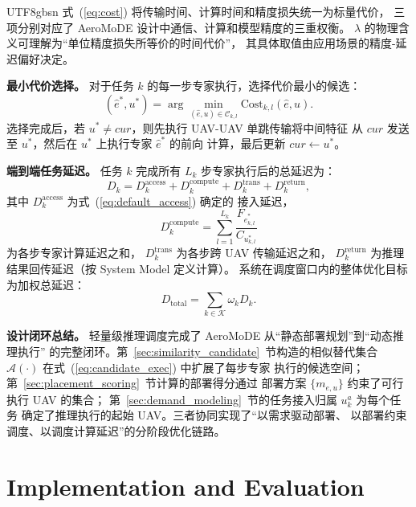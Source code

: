 \documentclass[conference]{IEEEtran}
\begin{document}
\begin{CJK*}{UTF8}{gbsn}
式~(\ref{eq:cost}) 将传输时间、计算时间和精度损失统一为标量代价，
三项分别对应了 AeroMoDE 设计中通信、计算和模型精度的三重权衡。
$\lambda$ 的物理含义可理解为``单位精度损失所等价的时间代价''，
其具体取值由应用场景的精度-延迟偏好决定。

\textbf{最小代价选择。}
对于任务 $k$ 的每一步专家执行，选择代价最小的候选：
\begin{equation}
(\hat{e}^*, u^*) = \arg\min_{(\hat{e},u)\in\mathcal{C}_{k,l}}
\mathrm{Cost}_{k,l}(\hat{e},u).
\label{eq:min_cost}
\end{equation}
选择完成后，若 $u^* \neq cur$，则先执行 UAV-UAV 单跳传输将中间特征
从 $cur$ 发送至 $u^*$，然后在 $u^*$ 上执行专家 $\hat{e}^*$ 的前向
计算，最后更新 $cur \leftarrow u^*$。

\textbf{端到端任务延迟。}
任务 $k$ 完成所有 $L_k$ 步专家执行后的总延迟为：
\begin{equation}
D_k = D_k^{\mathrm{access}} + D_k^{\mathrm{compute}}
    + D_k^{\mathrm{trans}} + D_k^{\mathrm{return}},
\label{eq:Dk}
\end{equation}
其中 $D_k^{\mathrm{access}}$ 为式~(\ref{eq:default_access}) 确定的
接入延迟，
\begin{equation}
D_k^{\mathrm{compute}} = \sum_{l=1}^{L_k} \frac{F_{\hat{e}^*_{k,l}}}{C_{u^*_{k,l}}}
\end{equation}
为各步专家计算延迟之和，
$D_k^{\mathrm{trans}}$ 为各步跨 UAV 传输延迟之和，
$D_k^{\mathrm{return}}$ 为推理结果回传延迟（按 System Model 定义计算）。
系统在调度窗口内的整体优化目标为加权总延迟：
\begin{equation}
D_{\mathrm{total}} = \sum_{k\in\mathcal{K}} \omega_k D_k.
\label{eq:Dtotal}
\end{equation}

\textbf{设计闭环总结。}
轻量级推理调度完成了 AeroMoDE 从``静态部署规划''到``动态推理执行''
的完整闭环。第~\ref{sec:similarity_candidate}~节构造的相似替代集合
$\mathcal{A}(\cdot)$ 在式~(\ref{eq:candidate_exec}) 中扩展了每步专家
执行的候选空间；第~\ref{sec:placement_scoring}~节计算的部署得分通过
部署方案 $\{m_{e,u}\}$ 约束了可行执行 UAV 的集合；
第~\ref{sec:demand_modeling}~节的任务接入归属 $u_k^a$ 为每个任务
确定了推理执行的起始 UAV。三者协同实现了``以需求驱动部署、
以部署约束调度、以调度计算延迟''的分阶段优化链路。

\section{Implementation and Evaluation}
\label{sec:eval}


\end{CJK*}
\end{document}
